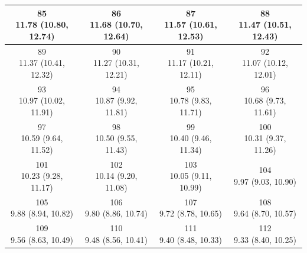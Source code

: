 \begin{table}[htbp]
\begin{tabular}{cccc}
\hline
\shortstack[c]{85\\11.78 (10.80, 12.74)} & \shortstack[c]{86\\11.68 (10.70, 12.64)} & \shortstack[c]{87\\11.57 (10.61, 12.53)} & \shortstack[c]{88\\11.47 (10.51, 12.43)} \\
\hline
\shortstack[c]{89\\11.37 (10.41, 12.32)} & \shortstack[c]{90\\11.27 (10.31, 12.21)} & \shortstack[c]{91\\11.17 (10.21, 12.11)} & \shortstack[c]{92\\11.07 (10.12, 12.01)} \\
\hline
\shortstack[c]{93\\10.97 (10.02, 11.91)} & \shortstack[c]{94\\10.87 (9.92, 11.81)} & \shortstack[c]{95\\10.78 (9.83, 11.71)} & \shortstack[c]{96\\10.68 (9.73, 11.61)} \\
\hline
\shortstack[c]{97\\10.59 (9.64, 11.52)} & \shortstack[c]{98\\10.50 (9.55, 11.43)} & \shortstack[c]{99\\10.40 (9.46, 11.34)} & \shortstack[c]{100\\10.31 (9.37, 11.26)} \\
\hline
\shortstack[c]{101\\10.23 (9.28, 11.17)} & \shortstack[c]{102\\10.14 (9.20, 11.08)} & \shortstack[c]{103\\10.05 (9.11, 10.99)} & \shortstack[c]{104\\9.97 (9.03, 10.90)} \\
\hline
\shortstack[c]{105\\9.88 (8.94, 10.82)} & \shortstack[c]{106\\9.80 (8.86, 10.74)} & \shortstack[c]{107\\9.72 (8.78, 10.65)} & \shortstack[c]{108\\9.64 (8.70, 10.57)} \\
\hline
\shortstack[c]{109\\9.56 (8.63, 10.49)} & \shortstack[c]{110\\9.48 (8.56, 10.41)} & \shortstack[c]{111\\9.40 (8.48, 10.33)} & \shortstack[c]{112\\9.33 (8.40, 10.25)} \\

\end{tabular}
\end{table}
